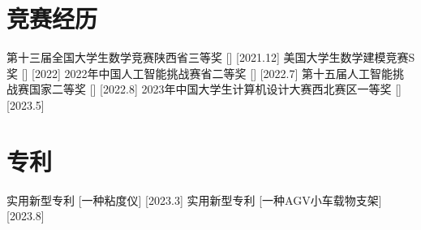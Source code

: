 \documentclass{resume}
\begin{document}
\section{竞赛经历}
\ResumeItem
{第十三届全国大学生数学竞赛陕西省三等奖}
[\textnormal{}]
[2021.12]
\ResumeItem
{美国大学生数学建模竞赛S奖}
[\textnormal{}]
[2022]
\ResumeItem
{2022年中国人工智能挑战赛省二等奖}
[\textnormal{}]
[2022.7]
\ResumeItem
{第十五届人工智能挑战赛国家二等奖}
[\textnormal{}]
[2022.8]
\ResumeItem
{2023年中国大学生计算机设计大赛西北赛区一等奖}
[\textnormal{}]
[2023.5]
\section{专利}
\ResumeItem
{实用新型专利}
[\textnormal{一种粘度仪}]
[2023.3]
\ResumeItem
{实用新型专利}
[\textnormal{一种AGV小车载物支架}]
[2023.8]
\end{document}
